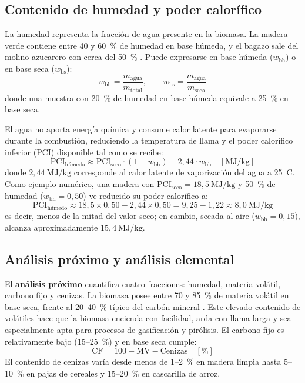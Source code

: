 \subsection{Contenido de humedad y poder calorífico}
La humedad representa la fracción de agua presente en la biomasa. La madera verde contiene entre 40 y 60~\% de humedad en base húmeda, y el bagazo sale del molino azucarero con cerca del 50~\% \cite{idae2007biomasa, vanloo2007handbook}. Puede expresarse en base húmeda ($w_{\mathrm{bh}}$) o en base seca ($w_{\mathrm{bs}}$):
\begin{equation}
w_{\mathrm{bh}} = \frac{m_{\mathrm{agua}}}{m_{\mathrm{total}}}, \qquad w_{\mathrm{bs}} = \frac{m_{\mathrm{agua}}}{m_{\mathrm{seca}}}
\end{equation}
donde una muestra con 20~\% de humedad en base húmeda equivale a 25~\% en base seca.

El agua no aporta energía química y consume calor latente para evaporarse durante la combustión, reduciendo la temperatura de llama y el poder calorífico inferior (PCI) disponible tal como se recibe:
\begin{equation}
\mathrm{PCI}_{\text{húmedo}} \approx \mathrm{PCI}_{\text{seco}} \cdot (1 - w_{\mathrm{bh}}) - 2{,}44 \cdot w_{\mathrm{bh}} \quad [\text{MJ/kg}]
\end{equation}
donde $2{,}44~\text{MJ/kg}$ corresponde al calor latente de vaporización del agua a 25~\textdegree C. Como ejemplo numérico, una madera con $\mathrm{PCI}_{\text{seco}} = 18{,}5~\text{MJ/kg}$ y 50~\% de humedad ($w_{\mathrm{bh}} = 0{,}50$) ve reducido su poder calorífico a:
\begin{equation*}
\mathrm{PCI}_{\text{húmedo}} \approx 18{,}5 \times 0{,}50 - 2{,}44 \times 0{,}50 = 9{,}25 - 1{,}22 \approx 8{,}0~\text{MJ/kg}
\end{equation*}
es decir, menos de la mitad del valor seco; en cambio, secada al aire ($w_{\mathrm{bh}} = 0{,}15$), alcanza aproximadamente $15{,}4~\text{MJ/kg}$.

\subsection{Análisis próximo y análisis elemental}
El \textbf{análisis próximo} cuantifica cuatro fracciones: humedad, materia volátil, carbono fijo y cenizas. La biomasa posee entre 70 y 85~\% de materia volátil en base seca, frente al 20--40~\% típico del carbón mineral \cite{vanloo2007handbook, mckendry2002energy}. Este elevado contenido de volátiles hace que la biomasa encienda con facilidad, arda con llama larga y sea especialmente apta para procesos de gasificación y pirólisis. El carbono fijo es relativamente bajo (15--25~\%) y en base seca cumple:
\begin{equation}
\mathrm{CF} = 100 - \mathrm{MV} - \mathrm{Cenizas} \quad [\%]
\end{equation}
El contenido de cenizas varía desde menos de 1--2~\% en madera limpia hasta 5--10~\% en pajas de cereales y 15--20~\% en cascarilla de arroz.

